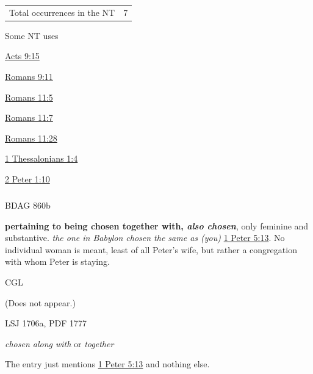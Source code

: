 				\begin{tabular}{ll}
					Total occurrences in the NT & 7
				\end{tabular}
				
				\begin{compactdesc}
					\item[Some NT uses] \textbf{}
						\begin{compactdesc}
							\item[{\hyperref[ACTS-9-15]{Acts 9:15}}]
							\item[{\hyperref[ROMANS-9-11]{Romans 9:11}}]
							\item[{\hyperref[ROMANS-11-5]{Romans 11:5}}]
							\item[{\hyperref[ROMANS-11-7]{Romans 11:7}}]
							\item[{\hyperref[ROMANS-11-28]{Romans 11:28}}]
							\item[{\hyperref[1THESSALONIANS-1-4]{1 Thessalonians 1:4}}]
							\item[{\hyperref[2PETER-1-10]{2 Peter 1:10}}]
						\end{compactdesc}
				\end{compactdesc}
				
				
			\subparagraph{\texorpdfstring{\gr{συνεκλεκτός}}{}}
				\label{SUNEKLEKTOS}
			
				\begin{compactdesc}
					\item[BDAG 860b] \textbf{}
						\begin{compactitem}
							\item \textbf{pertaining to being chosen together with, \textit{also chosen}}, only feminine and substantive.  \textit{the one in Babylon chosen the same as (you)} \hyperref[1PETER-5-13]{1 Peter 5:13}. No individual woman is meant, least of all Peter's wife, but rather a congregation with whom Peter is staying.
						\end{compactitem}
					\item[CGL] \textbf{}
						\begin{compactitem}
							\item (Does not appear.)
						\end{compactitem}
					\item[LSJ 1706a, PDF 1777] \textbf{}
						\begin{compactitem}
							\item \textit{chosen along with} or \textit{together}
								\begin{compactitem}
									\item The entry just mentions \hyperref[1PETER-5-13]{1 Peter 5:13} and nothing else.
								\end{compactitem}
						\end{compactitem}
				\end{compactdesc}
				
